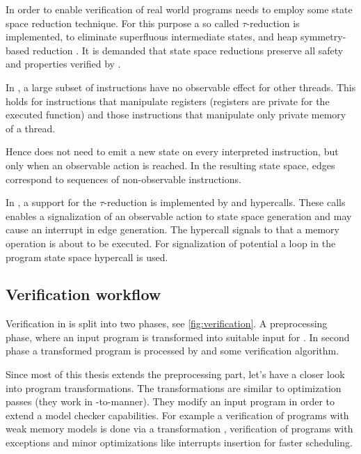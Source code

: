 In order to enable verification of real world programs \DIVINE needs to employ
some state space reduction technique. For this purpose a so called
$\tau$-reduction is implemented, to eliminate superfluous intermediate states,
and heap symmetry-based reduction \cite{Rockai13} \cite{RockaiCB17}. It is demanded
that state space reductions preserve all safety and \LTL properties verified
by \DIVINE.

In \LLVM, a large subset of instructions have no observable effect for other
threads. This holds for instructions that manipulate registers (registers
are private for the executed function) and those instructions that manipulate
only private memory of a thread.

Hence \DIVINE does not need to emit a new state on every interpreted
instruction, but only when an observable action is reached. In the resulting state
space, edges correspond to sequences of non-observable instructions.

In \DIVM, a support for the $\tau$-reduction is implemented by 
and  hypercalls. These calls enables a signalization of an
observable action to state space generation and may cause an interrupt in edge
generation. The  hypercall signals to \DIVM that a memory
operation is about to be executed.
For signalization of potential a loop in the
program state space  hypercall is used.
\subsection{Verification workflow}

Verification in \DIVINE is split into two phases, see \autoref{fig:verification}.
A preprocessing phase, where an input program is
transformed into suitable input for \DIVM. In second phase a transformed program
is processed by \DIVM and some verification algorithm.

Since most of this thesis extends the preprocessing part, let's have a closer
look into program transformations. The transformations are similar to \LLVM
optimization passes (they work in \LLVM -to-\LLVM manner). They modify an input
program in order to extend a model checker capabilities. For example a
verification of programs with weak memory models is done via a transformation
\cite{Still16}, verification of programs with exceptions \cite{Still17} and minor
optimizations like interrupts insertion for faster scheduling.

